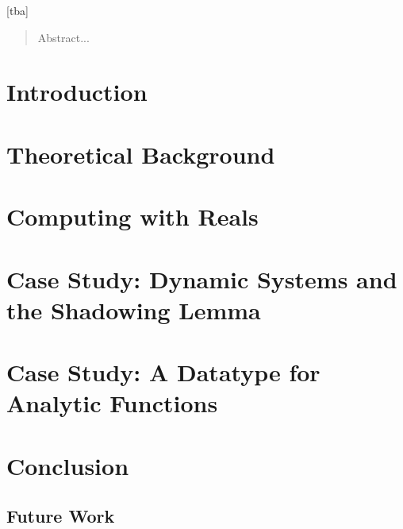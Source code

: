 \documentclass[tudarticle,type=msc,colorback,accentcolor=tud9c]{tudthesis}
\begin{document}
  \author{Holger Thies}
  [tba]
  \dateofexam{\today}{\today}
  \makethesistitle
\dedication{Danksagung...}
\begin{abstract}
    Abstract...
\end{abstract}  
\tableofcontents
  \chapter{Introduction}
  
  \chapter{Theoretical Background}
  
  
  \chapter{Computing with Reals}
  
  
  
  
  
  
  \chapter{Case Study: Dynamic Systems and the Shadowing Lemma}
  
  \chapter{Case Study: A Datatype for Analytic Functions}
  
  \chapter{Conclusion}
  \section{Future Work}
  
\end{document}
